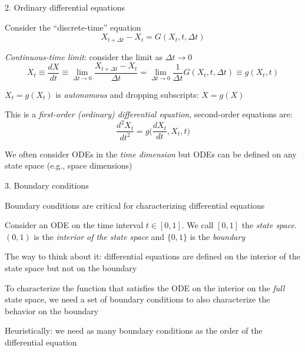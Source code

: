 \documentclass[11pt, aspectratio=169]{beamer}
\newenvironment{witemize}{\itemize\addtolength{\itemsep}{10pt}}{\enditemize}
\begin{document}
\begin{frame}{2. Ordinary differential equations}
\begin{witemize}
\item Consider the ``discrete-time'' equation 
\begin{equation*}
	X_{t+\Delta t} - X_t = G(X_t, t, \Delta t)
\end{equation*}

\item \textit{Continuous-time limit}: consider the limit as $\Delta t \to 0$
\begin{equation*}
	\dot X_t \equiv \frac{dX}{dt} \equiv \lim_{\Delta t \to 0} \frac{X_{t+\Delta t} - X_t}{\Delta t} = \lim_{\Delta t \to 0} \frac{1}{\Delta t} G(X_t, t, \Delta t) \equiv g(X_t, t)
\end{equation*}

\item $\dot X_t = g(X_t)$ is \textit{autonomous} and dropping subscripts: $\dot X = g(X)$

\item This is a \textit{first-order (ordinary) differential equation}, second-order equations are:
\begin{equation*}
	\frac{d^2 X_t}{dt^2} = g \bigg( \frac{dX_t}{dt} , X_t, t \bigg)
\end{equation*}

\item We often consider ODEs in the \textit{time dimension} but ODEs can be defined on any state space (e.g., space dimensions)

\end{witemize}
\end{frame}



\begin{frame}{3. Boundary conditions}
\begin{witemize}
\item Boundary conditions are critical for characterizing differential equations

\item Consider an ODE on the time interval $t \in [0, 1]$. We call $[0, 1]$ the \textit{state space}. $(0, 1)$ is the \textit{interior of the state space} and $\{0, 1\}$ is the \textit{boundary}

\item The way to think about it: differential equations are defined on the interior of the state space but not on the boundary

\item To characterize the function that satisfies the ODE on the interior on the \textit{full} state space, we need a set of boundary conditions to also characterize the behavior on the boundary

\item Heuristically: we need as many boundary conditions as the order of the differential equation
\end{witemize}
\end{frame}
\end{document}

